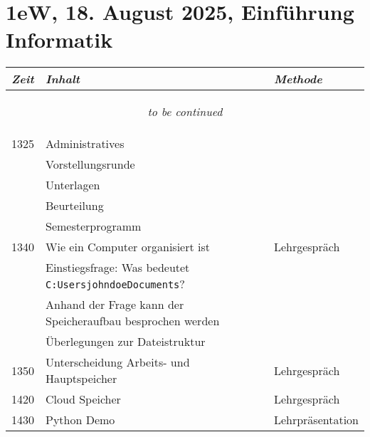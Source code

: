 \documentclass[a4paper]{scrreprt}
\begin{document}
\section*{1eW, 18. August 2025, Einführung Informatik}
\begin{longtable}{p{1.5cm}>{\RaggedRight}p{7.5cm}p{2.5cm}}
    \toprule
    \emph{Zeit}&\emph{Inhalt}&\emph{Methode}\\
    \midrule
    \endhead

    \midrule
    \multicolumn{3}{c}{\begin{tiny}\textit{to be continued}\end{tiny}}\\
    \midrule
    \endfoot

    \bottomrule
    \endlastfoot

    1325&Administratives&\\
        &Vorstellungsrunde&\\
        &Unterlagen&\\
        &Beurteilung&\\
        &Semesterprogramm&\\ [5pt]

    1340&Wie ein Computer organisiert ist&Lehrgespräch\\
        &Einstiegsfrage: Was bedeutet
         \texttt{C:\/Users\/johndoe\/Documents}?&\\
        &Anhand der Frage kann der Speicheraufbau besprochen werden&\\
        &Überlegungen zur Dateistruktur&\\
        [5pt]

    1350&Unterscheidung Arbeits- und Hauptspeicher&Lehrgespräch\\ [5pt]

    1420&Cloud Speicher&Lehrgespräch\\ [5pt]

    1430&Python Demo&Lehrpräsentation\\





\end{longtable}
\end{document}
